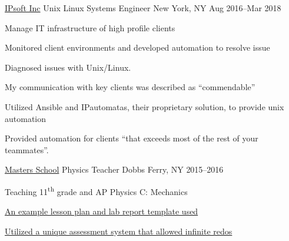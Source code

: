 \begin{cventries}
\cventry
    {\href{www.ipsoft.com}{IPsoft Inc}}
    {Unix Linux Systems Engineer}
    {New York, NY} {Aug 2016--Mar 2018}
    {
    \begin{cvitems}
        \item Manage IT infrastructure of high profile clients
        \item Monitored client environments and developed automation to resolve issue
        \item Diagnosed issues with Unix/Linux.
      \item My communication with key clients was described as ``commendable''
      \item Utilized Ansible and IPautomatas, their proprietary solution, to provide unix automation
      \item Provided automation for clients ``that exceeds most of the rest of your teammates''.
    \end{cvitems}
    }

\cventry
    {\href{mastersny.org}{Masters School}}
    {Physics Teacher}
    {Dobbs Ferry, NY} {2015--2016}
    {
    \begin{cvitems}
      \item {Teaching 11\textsuperscript{th} grade and AP Physics C: Mechanics}
      \item {\href{https://github.com/jphafner/physicsReport}{An example lesson plan and lab report template used}}
      \item {\href{https://github.com/jphafner/physicsAMC}{Utilized a unique assessment system that allowed infinite redos}}
    \end{cvitems}
    }


\end{cventries}
